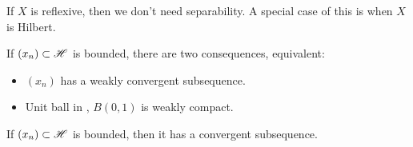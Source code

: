 \begin{remark}\nl
    If $X$ is reflexive, then we don't need separability. A special case of this is when $X$ is Hilbert.
\end{remark}

\begin{corollary}\nl
    If $(x_n)\subset \mathscr{H}$ is bounded, there are two consequences, equivalent:
    \begin{itemize}
        \item $(x_n)$ has a weakly convergent subsequence.
        \item Unit ball in \hbs, $B(0,1)$ is weakly compact.
    \end{itemize}
    {\color{blue}If $(x_n)\subset \mathscr{H}$ is bounded, then it has a convergent subsequence. }
\end{corollary}

